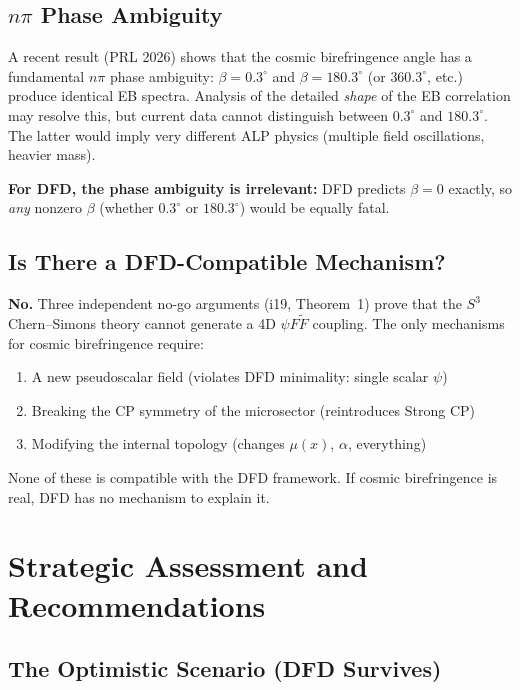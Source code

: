 \documentclass[11pt]{article}
\newcommand{\CS}{Chern--Simons}
\begin{document}
\subsection{$n\pi$ Phase Ambiguity}

A recent result (PRL 2026) shows that the cosmic birefringence angle
has a fundamental $n\pi$ phase ambiguity: $\beta = 0.3^\circ$ and
$\beta = 180.3^\circ$ (or $360.3^\circ$, etc.) produce identical
EB spectra.  Analysis of the detailed \emph{shape} of the EB
correlation may resolve this, but current data cannot distinguish
between $0.3^\circ$ and $180.3^\circ$.  The latter would imply
very different ALP physics (multiple field oscillations, heavier mass).

\textbf{For DFD, the phase ambiguity is irrelevant:} DFD predicts
$\beta = 0$ exactly, so \emph{any} nonzero $\beta$ (whether
$0.3^\circ$ or $180.3^\circ$) would be equally fatal.

\subsection{Is There a DFD-Compatible Mechanism?}

\textbf{No.}  Three independent no-go arguments (i19, Theorem~1)
prove that the $S^3$ \CS{} theory cannot generate a 4D
$\psi F\tilde{F}$ coupling.  The only mechanisms for cosmic
birefringence require:
\begin{enumerate}
\item A new pseudoscalar field (violates DFD minimality: single
  scalar $\psi$)
\item Breaking the CP symmetry of the microsector (reintroduces
  Strong CP)
\item Modifying the internal topology (changes $\mu(x)$, $\alpha$,
  everything)
\end{enumerate}

None of these is compatible with the DFD framework.  If cosmic
birefringence is real, DFD has no mechanism to explain it.


\section{Strategic Assessment and Recommendations}
\label{sec:strategy}

\subsection{The Optimistic Scenario (DFD Survives)}
\end{document}
